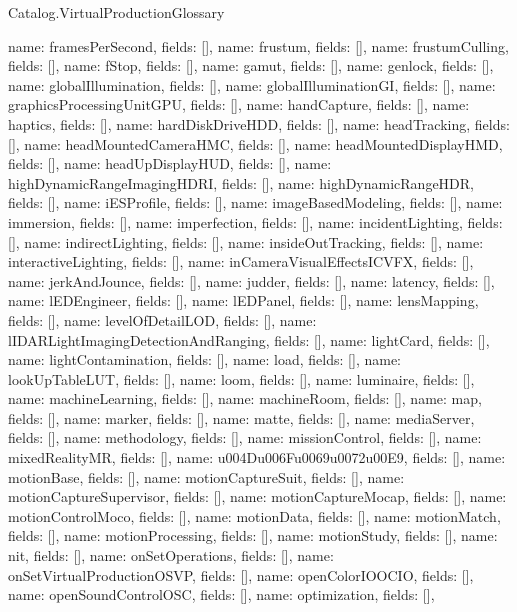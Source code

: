 \begin{lexlean}{Catalog.VirtualProductionGlossary}
\begin{semanticmodule}
{    {name: framesPerSecond, fields: []},
    {name: frustum, fields: []},
    {name: frustumCulling, fields: []},
    {name: fStop, fields: []},
    {name: gamut, fields: []},
    {name: genlock, fields: []},
    {name: globalIllumination, fields: []},
    {name: globalIlluminationGI, fields: []},
    {name: graphicsProcessingUnitGPU, fields: []},
    {name: handCapture, fields: []},
    {name: haptics, fields: []},
    {name: hardDiskDriveHDD, fields: []},
    {name: headTracking, fields: []},
    {name: headMountedCameraHMC, fields: []},
    {name: headMountedDisplayHMD, fields: []},
    {name: headUpDisplayHUD, fields: []},
    {name: highDynamicRangeImagingHDRI, fields: []},
    {name: highDynamicRangeHDR, fields: []},
    {name: iESProfile, fields: []},
    {name: imageBasedModeling, fields: []},
    {name: immersion, fields: []},
    {name: imperfection, fields: []},
    {name: incidentLighting, fields: []},
    {name: indirectLighting, fields: []},
    {name: insideOutTracking, fields: []},
    {name: interactiveLighting, fields: []},
    {name: inCameraVisualEffectsICVFX, fields: []},
    {name: jerkAndJounce, fields: []},
    {name: judder, fields: []},
    {name: latency, fields: []},
    {name: lEDEngineer, fields: []},
    {name: lEDPanel, fields: []},
    {name: lensMapping, fields: []},
    {name: levelOfDetailLOD, fields: []},
    {name: lIDARLightImagingDetectionAndRanging, fields: []},
    {name: lightCard, fields: []},
    {name: lightContamination, fields: []},
    {name: load, fields: []},
    {name: lookUpTableLUT, fields: []},
    {name: loom, fields: []},
    {name: luminaire, fields: []},
    {name: machineLearning, fields: []},
    {name: machineRoom, fields: []},
    {name: map, fields: []},
    {name: marker, fields: []},
    {name: matte, fields: []},
    {name: mediaServer, fields: []},
    {name: methodology, fields: []},
    {name: missionControl, fields: []},
    {name: mixedRealityMR, fields: []},
    {name: u004Du006Fu0069u0072u00E9, fields: []},
    {name: motionBase, fields: []},
    {name: motionCaptureSuit, fields: []},
    {name: motionCaptureSupervisor, fields: []},
    {name: motionCaptureMocap, fields: []},
    {name: motionControlMoco, fields: []},
    {name: motionData, fields: []},
    {name: motionMatch, fields: []},
    {name: motionProcessing, fields: []},
    {name: motionStudy, fields: []},
    {name: nit, fields: []},
    {name: onSetOperations, fields: []},
    {name: onSetVirtualProductionOSVP, fields: []},
    {name: openColorIOOCIO, fields: []},
    {name: openSoundControlOSC, fields: []},
    {name: optimization, fields: []},
}
\end{semanticmodule}
\end{lexlean}
